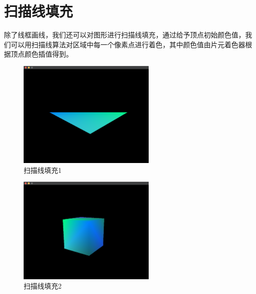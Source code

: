     \section{扫描线填充}
    除了线框画线，我们还可以对图形进行扫描线填充，通过给予顶点初始颜色值，我们可以用扫描线算法对区域中每一个像素点进行着色，其中颜色值由片元着色器根据顶点颜色插值得到。
        \begin{figure}[H]
    	\centering
		\includegraphics[width=0.6\textwidth]{images/demo5.png}
		\caption{扫描线填充1}
		\label{demo5}
    \end{figure}  
    
        \begin{figure}[H]
    	\centering
		\includegraphics[width=0.6\textwidth]{images/demo11.png}
		\caption{扫描线填充2}
		\label{demo11}
    \end{figure} 
    
